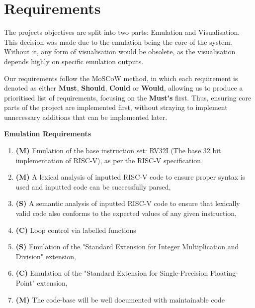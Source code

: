
\chapter{Requirements}
\label{ch:requirements}
The projects objectives are split into two parts: Emulation and Visualisation. This decision was made due to the emulation being the core of the system. Without it, any form of visualisation would be obsolete, as the visualisation depends highly on specific emulation outputs.

Our requirements follow the MoSCoW method, in which each requirement is denoted as either \textbf{Must}, \textbf{Should}, \textbf{Could} or \textbf{Would}, allowing us to produce a prioritised list of requirements, focusing on the \textbf{Must's} first. Thus, ensuring core parts of the project are implemented first, without straying to implement unnecessary additions that can be implemented later.

\textbf{Emulation Requirements}
\begin{enumerate}[label={E\theenumi}]
    \item \label{req:e1} \textbf{(M)} Emulation of the base instruction set: RV32I \cite{waterman_2019_the} (The base 32 bit implementation of RISC-V), as per the RISC-V specification,
    \item \label{req:e2} \textbf{(M)} A lexical analysis of inputted RISC-V code to ensure proper syntax is used and inputted code can be successfully parsed,
    \item \label{req:e3} \textbf{(S)} A semantic analysis of inputted RISC-V code to ensure that lexically valid code also conforms to the expected values of any given instruction,
    \item \label{req:e4} \textbf{(C)} Loop control via labelled functions
    \item \label{req:md} \textbf{(S)} Emulation of the "Standard Extension for Integer Multiplication and Division" extension,
    \item \label{req:fp} \textbf{(C)} Emulation of the "Standard Extension for Single-Precision Floating-Point" extension,
 
    \item \label{req:e7} \textbf{(M)} The code-base will be well documented with maintainable code
\end{enumerate}


